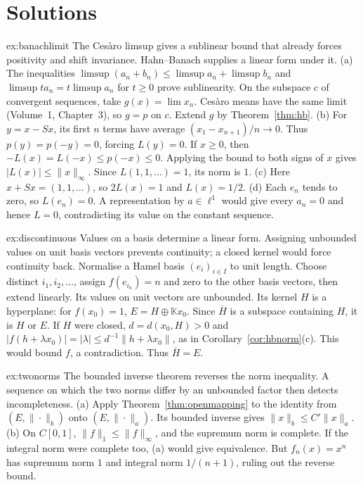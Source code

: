 \section{Solutions}

\begin{solution}{ex:banachlimit}
\idea The Ces\`aro limsup gives a sublinear bound that already forces positivity and shift invariance. Hahn--Banach supplies a linear form under it.
\writeup (a) The inequalities $\limsup(a_n+b_n)\le\limsup a_n+\limsup b_n$ and $\limsup ta_n=t\limsup a_n$ for $t\ge0$ prove sublinearity. On the subspace $c$ of convergent sequences, take $g(x)=\lim x_n$. Ces\`aro means have the same limit (Volume~1, Chapter~3), so $g=p$ on $c$. Extend $g$ by Theorem~\ref{thm:hb}. (b) For $y=x-Sx$, its first $n$ terms have average $(x_1-x_{n+1})/n\to0$. Thus $p(y)=p(-y)=0$, forcing $L(y)=0$. If $x\ge0$, then $-L(x)=L(-x)\le p(-x)\le0$. Applying the bound to both signs of $x$ gives $|L(x)|\le\|x\|_\infty$. Since $L(1,1,\dots)=1$, its norm is $1$. (c) Here $x+Sx=(1,1,\dots)$, so $2L(x)=1$ and $L(x)=1/2$. (d) Each $e_n$ tends to zero, so $L(e_n)=0$. A representation by $a\in\ell^1$ would give every $a_n=0$ and hence $L=0$, contradicting its value on the constant sequence.
\end{solution}
\begin{solution}{ex:discontinuous}
\idea Values on a basis determine a linear form. Assigning unbounded values on unit basis vectors prevents continuity; a closed kernel would force continuity back.
\writeup Normalise a Hamel basis $(e_i)_{i\in I}$ to unit length. Choose distinct $i_1,i_2,\dots$, assign $f(e_{i_n})=n$ and zero to the other basis vectors, then extend linearly. Its values on unit vectors are unbounded. Its kernel $H$ is a hyperplane: for $f(x_0)=1$, $E=H\oplus\mathbb Kx_0$. Since $\overline H$ is a subspace containing $H$, it is $H$ or $E$. If $H$ were closed, $d=d(x_0,H)>0$ and $|f(h+\lambda x_0)|=|\lambda|\le d^{-1}\|h+\lambda x_0\|$, as in Corollary~\ref{cor:hbnorm}(c). This would bound $f$, a contradiction. Thus $\overline H=E$.
\end{solution}
\begin{solution}{ex:twonorms}
\idea The bounded inverse theorem reverses the norm inequality. A sequence on which the two norms differ by an unbounded factor then detects incompleteness.
\writeup (a) Apply Theorem~\ref{thm:openmapping} to the identity from $(E,\|\cdot\|_b)$ onto $(E,\|\cdot\|_a)$. Its bounded inverse gives $\|x\|_b\le C'\|x\|_a$. (b) On $C[0,1]$, $\|f\|_1\le\|f\|_\infty$, and the supremum norm is complete. If the integral norm were complete too, (a) would give equivalence. But $f_n(x)=x^n$ has supremum norm $1$ and integral norm $1/(n+1)$, ruling out the reverse bound.
\end{solution}
